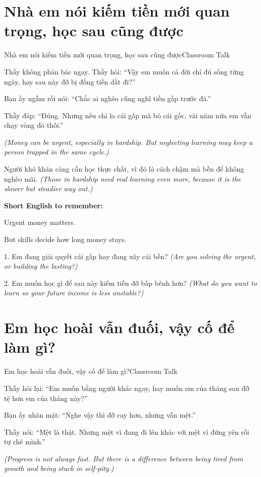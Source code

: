 \section{Nhà em nói kiếm tiền mới quan trọng, học sau cũng được}
\begin{truyen}{Nhà em nói kiếm tiền mới quan trọng, học sau cũng được}{Classroom Talk}

Thầy không phản bác ngay. Thầy hỏi: ``Vậy em muốn cả đời chỉ đủ sống từng ngày, hay sau này đỡ bị đồng tiền dắt đi?''

Bạn ấy ngẫm rồi nói: ``Chắc ai nghèo cũng nghĩ tiền gấp trước đã.''

Thầy đáp: ``Đúng. Nhưng nếu chỉ lo cái gấp mà bỏ cái gốc, vài năm nữa em vẫn chạy vòng đó thôi.''

\textit{(Money can be urgent, especially in hardship. But neglecting learning may keep a person trapped in the same cycle.)}
\end{truyen}

\begin{baihoc}
Người khó khăn càng cần học thực chất, vì đó là cách chậm mà bền để không nghèo mãi.
\textit{(Those in hardship need real learning even more, because it is the slower but steadier way out.)}
\end{baihoc}

\begin{ghinhoanh}
\textbf{Short English to remember:}

Urgent money matters.

But skills decide how long money stays.
\end{ghinhoanh}

\begin{tuhocnhanh}
1. Em đang giải quyết cái gấp hay đang xây cái bền? \textit{(Are you solving the urgent, or building the lasting?)}

2. Em muốn học gì để sau này kiếm tiền đỡ bấp bênh hơn? \textit{(What do you want to learn so your future income is less unstable?)}
\end{tuhocnhanh}
\ngancach

\section{Em học hoài vẫn đuối, vậy cố để làm gì?}
\begin{truyen}{Em học hoài vẫn đuối, vậy cố để làm gì?}{Classroom Talk}

Thầy hỏi lại: ``Em muốn bằng người khác ngay, hay muốn em của tháng sau đỡ tệ hơn em của tháng này?''

Bạn ấy nhăn mặt: ``Nghe vậy thì đỡ cay hơn, nhưng vẫn mệt.''

Thầy nói: ``Mệt là thật. Nhưng mệt vì đang đi lên khác với mệt vì đứng yên rồi tự chê mình.''

\textit{(Progress is not always fast. But there is a difference between being tired from growth and being stuck in self-pity.)}
\end{truyen}

